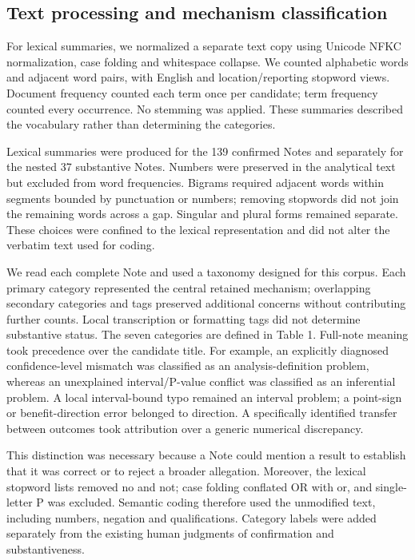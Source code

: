 \documentclass[11pt,a4paper]{article}
\begin{document}
\subsection{Text processing and mechanism classification}
For lexical summaries, we normalized a separate text copy using Unicode NFKC normalization, case folding and whitespace collapse. We counted alphabetic words and adjacent word pairs, with English and location/reporting stopword views. Document frequency counted each term once per candidate; term frequency counted every occurrence. No stemming was applied. These summaries described the vocabulary rather than determining the categories.\par
Lexical summaries were produced for the 139 confirmed Notes and separately for the nested 37 substantive Notes. Numbers were preserved in the analytical text but excluded from word frequencies. Bigrams required adjacent words within segments bounded by punctuation or numbers; removing stopwords did not join the remaining words across a gap. Singular and plural forms remained separate. These choices were confined to the lexical representation and did not alter the verbatim text used for coding.\par
We read each complete Note and used a taxonomy designed for this corpus. Each primary category represented the central retained mechanism; overlapping secondary categories and tags preserved additional concerns without contributing further counts. Local transcription or formatting tags did not determine substantive status. The seven categories are defined in Table 1. Full-note meaning took precedence over the candidate title. For example, an explicitly diagnosed confidence-level mismatch was classified as an analysis-definition problem, whereas an unexplained interval/P-value conflict was classified as an inferential problem. A local interval-bound typo remained an interval problem; a point-sign or benefit-direction error belonged to direction. A specifically identified transfer between outcomes took attribution over a generic numerical discrepancy.\par
This distinction was necessary because a Note could mention a result to establish that it was correct or to reject a broader allegation. Moreover, the lexical stopword lists removed no and not; case folding conflated OR with or, and single-letter P was excluded. Semantic coding therefore used the unmodified text, including numbers, negation and qualifications. Category labels were added separately from the existing human judgments of confirmation and substantiveness.\par
\end{document}
